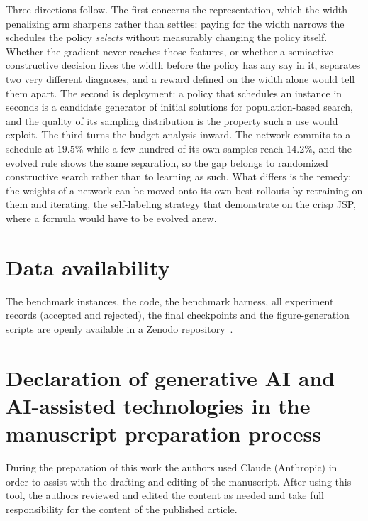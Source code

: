\documentclass[preprint,12pt]{elsarticle}
\theoremstyle{definition}
\theoremstyle{remark}
\begin{document}
Three directions follow. The first concerns the representation, which
the width-penalizing arm sharpens rather than settles: paying for the
width narrows the schedules the policy \emph{selects} without
measurably changing the policy itself. Whether the gradient never
reaches those features, or whether a semiactive constructive decision
fixes the width before the policy has any say in it, separates two
very different diagnoses, and a reward defined on the width alone
would tell them apart. The second is deployment: a policy that
schedules an instance in seconds is a candidate generator of initial
solutions for population-based search, and the quality of its
sampling distribution is the property such a use would exploit. The
third turns the budget analysis inward. The network commits to a
schedule at $19.5\%$ while a few hundred of its own samples reach
$14.2\%$, and the evolved rule shows the same separation, so the gap
belongs to randomized constructive search rather than to learning as
such. What
differs is the remedy: the weights of a network can be moved onto its
own best rollouts by retraining on them and iterating, the
self-labeling strategy that \citet{Corsini2024} demonstrate on the
crisp JSP, where a formula would have to be evolved anew.


\section*{Data availability}
The benchmark instances, the code,
the benchmark harness, all experiment records (accepted and
rejected), the final checkpoints and the figure-generation scripts
are openly available in a Zenodo
repository~\citep{DiazDRLDataset2026}.

\section*{Declaration of generative AI and AI-assisted technologies
in the manuscript preparation process}
During the preparation of this work the authors used Claude
(Anthropic) in order to assist with the drafting and editing of the
manuscript. After using this tool, the authors reviewed and edited
the content as needed and take full responsibility for the content of
the published article.
\end{document}
